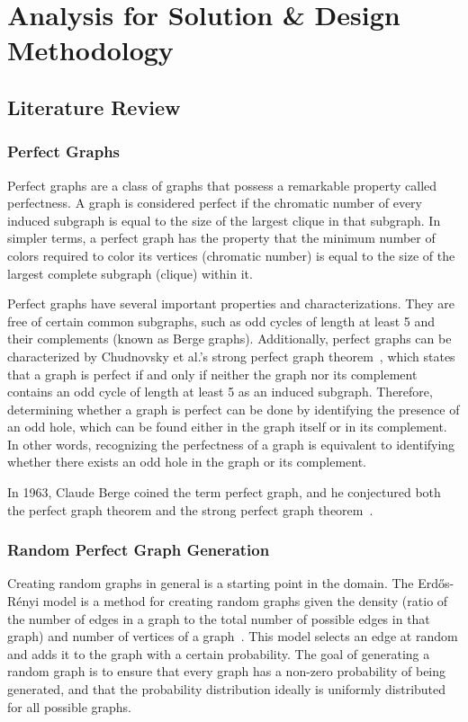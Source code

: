 \section{Analysis for Solution \& Design Methodology}

\subsection{Literature Review}

\subsubsection{Perfect Graphs}

Perfect graphs are a class of graphs that possess a remarkable property called perfectness. A graph is considered perfect if the chromatic number of every induced subgraph is equal to the size of the largest clique in that subgraph. In simpler terms, a perfect graph has the property that the minimum number of colors required to color its vertices (chromatic number) is equal to the size of the largest complete subgraph (clique) within it.

Perfect graphs have several important properties and characterizations. They are free of certain common subgraphs, such as odd cycles of length at least 5 and their complements (known as Berge graphs). Additionally, perfect graphs can be characterized by Chudnovsky et al.'s strong perfect graph theorem~\cite{spgt}, which states that a graph is perfect if and only if neither the graph nor its complement contains an odd cycle of length at least 5 as an induced subgraph. Therefore, determining whether a graph is perfect can be done by identifying the presence of an odd hole, which can be found either in the graph itself or in its complement. In other words, recognizing the perfectness of a graph is equivalent to identifying whether there exists an odd hole in the graph or its complement.

In 1963, Claude Berge coined the term perfect graph, and he conjectured both the perfect graph theorem and the strong perfect graph theorem~\cite{berge}. 

\subsubsection{Random Perfect Graph Generation}

Creating random graphs in general is a starting point in the domain. The Erdős-Rényi model is a method for creating random graphs given the density (ratio of the number of edges in a graph to the total number of possible edges in that graph) and number of vertices of a graph~\cite{erdos}. This model selects an edge at random and adds it to the graph with a certain probability. The goal of generating a random graph is to ensure that every graph has a non-zero probability of being generated, and that the probability distribution ideally is uniformly distributed for all possible graphs.
 
